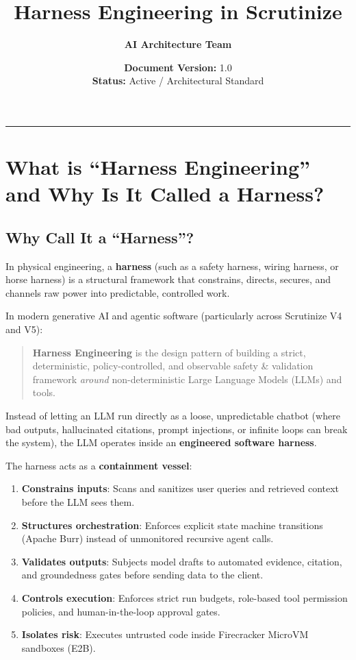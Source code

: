 \documentclass{article}
\title{\textbf{Harness Engineering in Scrutinize}}
\author{\textbf{AI Architecture Team}}
\date{\textbf{Document Version:} 1.0 \\ \textbf{Status:} Active / Architectural Standard}
\begin{document}
\maketitle

\hrule
\vspace{0.5cm}

\section{What is ``Harness Engineering'' and Why Is It Called a Harness?}

\subsection{Why Call It a ``Harness''?}
In physical engineering, a \textbf{harness} (such as a safety harness, wiring harness, or horse harness) is a structural framework that constrains, directs, secures, and channels raw power into predictable, controlled work.

In modern generative AI and agentic software (particularly across Scrutinize V4 and V5):
\begin{quote}
\textbf{Harness Engineering} is the design pattern of building a strict, deterministic, policy-controlled, and observable safety \& validation framework \emph{around} non-deterministic Large Language Models (LLMs) and tools.
\end{quote}

Instead of letting an LLM run directly as a loose, unpredictable chatbot (where bad outputs, hallucinated citations, prompt injections, or infinite loops can break the system), the LLM operates inside an \textbf{engineered software harness}.

The harness acts as a \textbf{containment vessel}:
\begin{enumerate}
    \item \textbf{Constrains inputs}: Scans and sanitizes user queries and retrieved context before the LLM sees them.
    \item \textbf{Structures orchestration}: Enforces explicit state machine transitions (Apache Burr) instead of unmonitored recursive agent calls.
    \item \textbf{Validates outputs}: Subjects model drafts to automated evidence, citation, and groundedness gates before sending data to the client.
    \item \textbf{Controls execution}: Enforces strict run budgets, role-based tool permission policies, and human-in-the-loop approval gates.
    \item \textbf{Isolates risk}: Executes untrusted code inside Firecracker MicroVM sandboxes (E2B).
\end{enumerate}
\end{document}
